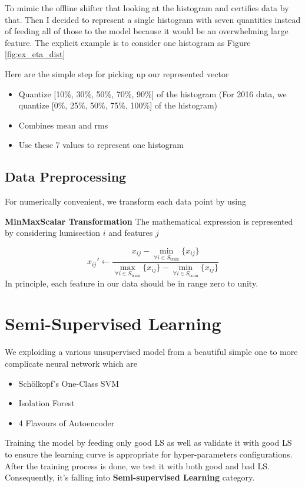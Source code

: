 To mimic the offline shifter that looking at the histogram and certifies data by that.
Then I decided to represent a single histogram with seven quantities instead of feeding all of those to the model because it would be an overwhelming large feature.
The explicit example is to consider one histogram as Figure \ref{fig:ex_eta_dist}

Here are the simple step for picking up our represented vector
\begin{itemize}
    \item Quantize [10\%, 30\%, 50\%, 70\%, 90\%] of the histogram (For 2016 data, we quantize [0\%, 25\%, 50\%, 75\%, 100\%] of the histogram)
    \item Combines mean and rms
    \item Use these 7 values to represent one histogram
\end{itemize}


\subsection{Data Preprocessing}

For numerically convenient, we transform each data point by using 

\textbf{MinMaxScalar Transformation} The mathematical expression is represented by considering lumisection $i$ and features $j$

\begin{equation}
    x_{ij}' \leftarrow \frac{x_{ij} - \min_{\forall i\in S_{\text{train}}}\{x_{ij}\}}{\max_{\forall i\in S_{\text{train}}}\{x_{ij}\} - \min_{\forall i\in S_{\text{train}}}\{x_{ij}\} }
\end{equation}
In principle, each feature in our data should be in range zero to unity.

\section{Semi-Supervised Learning}
We exploiding a various unsupervised model from a beautiful simple one to more complicate neural network which are
\begin{itemize}
    \item Sch\"{o}lkopf's One-Class SVM
    \item Isolation Forest
    \item 4 Flavours of Autoencoder
\end{itemize}
Training the model by feeding only good LS as well as validate it with good LS to ensure the learning curve is appropriate for hyper-parameters configurations.
After the training process is done, we test it with both good and bad LS. Consequently, it's falling into \textbf{Semi-supervised Learning} category.


